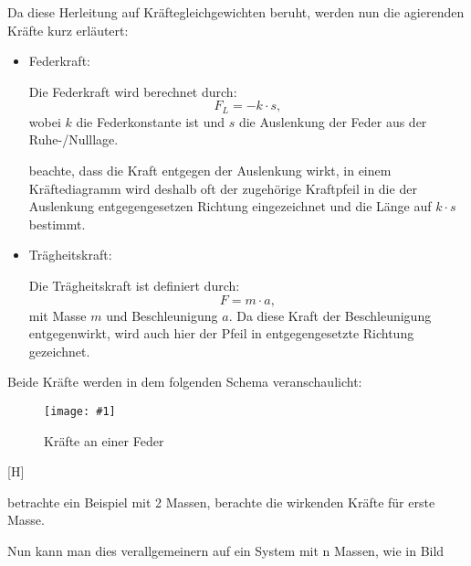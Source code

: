 \documentclass[ngerman,BCOR=4mm]{tudscrreprt}
\newcommand{\bild}[2]{\texttt{[image: \#1]}}
\theoremstyle{plain} %
\theoremstyle{definition} %
\theoremstyle{remark}
\begin{document}
            Da diese Herleitung auf Kräftegleichgewichten beruht, werden nun die agierenden Kräfte kurz erläutert:

            \begin{itemize}
                  \item Federkraft:
                  
                        Die Federkraft wird berechnet durch:
                        \begin{equation}
                              \label{eqn: Federkraft}
                              F_L = -k\cdot s,
                        \end{equation}
                        wobei $k$ die Federkonstante ist und $s$ die Auslenkung der Feder aus der Ruhe-/Nulllage.

                        beachte, dass die Kraft entgegen der Auslenkung wirkt,
                        in einem Kräftediagramm wird deshalb oft der zugehörige Kraftpfeil in die der Auslenkung entgegengesetzen Richtung eingezeichnet und die Länge auf $k\cdot s$ bestimmt.
                  \item Trägheitskraft:
                  
                        Die Trägheitskraft ist definiert durch:
                        \begin{equation}
                              \label{eqn: Trägheitskraft}
                              F = m\cdot a,
                        \end{equation}
                        mit Masse $m$ und Beschleunigung $a$.
                        Da diese Kraft der Beschleunigung entgegenwirkt, wird auch hier der Pfeil in entgegengesetzte Richtung gezeichnet.
            \end{itemize}

            Beide Kräfte werden in dem folgenden Schema veranschaulicht:

                  
            \begin{figure}[H]
                  \centering
                  \bild{"./src/KräfteAnFeder.png"}{0.3}
                  \label{fig: KräfteAnFeder}
                  \caption{Kräfte an einer Feder}\cite{federkraft}
            \end{figure}[H]
            


            betrachte ein Beispiel mit 2 Massen, berachte die wirkenden Kräfte für erste Masse.

            Nun kann man dies verallgemeinern auf ein System mit n Massen, wie in Bild
\end{document}
